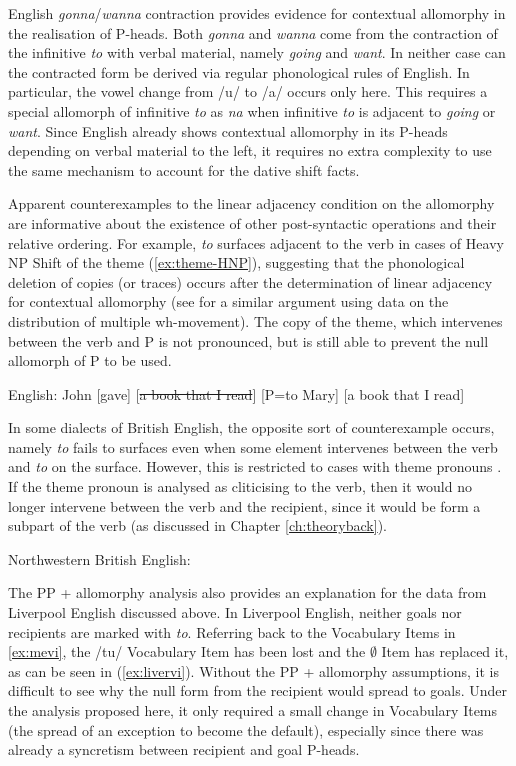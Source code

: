 	English \textit{gonna}/\textit{wanna} contraction provides evidence for contextual allomorphy in the realisation of P-heads. Both \textit{gonna} and \textit{wanna} come from the contraction of the infinitive \textit{to} with verbal material, namely \textit{going} and \textit{want}. In neither case can the contracted form be derived via regular phonological rules of English. In particular, the vowel change from /u/ to /a/ occurs only here. This requires a special allomorph of infinitive \textit{to} as \textit{na} when infinitive \textit{to} is adjacent to \textit{going} or \textit{want}. Since English already shows contextual allomorphy in its P-heads depending on verbal material to the left, it requires no extra complexity to use the same mechanism to account for the dative shift facts.

	Apparent counterexamples to the linear adjacency condition on the allomorphy are informative about the existence of other post-syntactic operations and their relative ordering. For example, \textit{to} surfaces adjacent to the verb in cases of Heavy NP Shift of the theme (\ref{ex:theme-HNP}), suggesting that the phonological deletion of copies (or traces) occurs after the determination of linear adjacency for contextual allomorphy (see \citet{Franks} for a similar argument using data on the distribution of multiple wh-movement). The copy of the theme, which intervenes between the verb and P is not pronounced, but is still able to prevent the null allomorph of P to be used.
	\begin{exe}
		\ex \label{ex:theme-HNP} English: John [gave] [\sout{a book that I read}] [P=to Mary] [a book that I read]
	\end{exe}
	In some dialects of British English, the opposite sort of counterexample occurs, namely \textit{to} fails to surfaces even when some element intervenes between the verb and \textit{to} on the surface. However, this is restricted to cases with theme pronouns \citep{Biggs.2015}. If the theme pronoun is analysed as cliticising to the verb, then it would no longer intervene between the verb and the recipient, since it would be form a subpart of the verb (as discussed in Chapter \ref{ch:theoryback}).
	\begin{exe}
		\ex Northwestern British English:\label{ex:nw-brit-P}
		\begin{xlist}
		\ex[ ]{John [gave=it] [P=$\emptyset$ Mary]}
		\ex[*]{John [gave] [the book] [P=$\emptyset$ Mary]}
	\end{xlist}
	\end{exe}
	The PP + allomorphy analysis also provides an explanation for the data from Liverpool English discussed above. In Liverpool English, neither goals nor recipients are marked with \textit{to}. Referring back to the Vocabulary Items in \ref{ex:mevi}, the /tu/ Vocabulary Item has been lost and the $\emptyset$ Item has replaced it, as can be seen in (\ref{ex:livervi}). Without the PP + allomorphy assumptions, it is difficult to see why the null form from the recipient would spread to goals. Under the analysis proposed here, it only required a small change in Vocabulary Items (the spread of an exception to become the default), especially since there was already a syncretism between recipient and goal P-heads.

